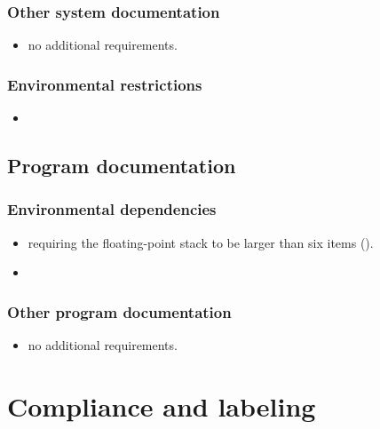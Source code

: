 \subsubsection{Other system documentation} %
\begin{itemize}
\item no additional requirements.
\end{itemize}

\subsubsection{Environmental restrictions} %
\label{float:restrictions}

\begin{itemize}
\item {}
\end{itemize}

\subsection{Program documentation} %

\subsubsection{Environmental dependencies} %
\label{float:dependencies}

\begin{itemize}
\item requiring the floating-point stack to be larger than six items
	().
\item {}
\end{itemize}

\subsubsection{Other program documentation} %
\begin{itemize}
\item no additional requirements.
\end{itemize}

\section{Compliance and labeling} %

